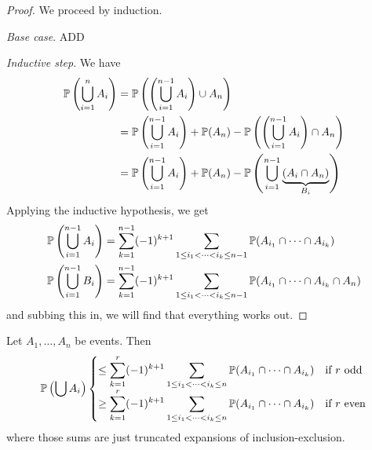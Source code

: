 \documentclass{../../template/note}
\begin{document}
    \begin{proof}
        We proceed by induction.

        \emph{Base case}. ADD

        \emph{Inductive step}. We have
        \begin{align*}
            \mathbb P\left(\bigcup_{i=1}^n A_i\right) &= \mathbb P\left(\left(\bigcup_{i=1}^{n-1} A_i\right) \cup A_n\right) \\
            &= \mathbb P\left(\bigcup_{i=1}^{n-1} A_i\right) + \mathbb P(A_n) - \mathbb P\left(\left(\bigcup_{i=1}^{n-1} A_i\right) \cap A_n\right) \\
            &= \mathbb P\left(\bigcup_{i=1}^{n-1} A_i\right) + \mathbb P(A_n) - \mathbb P\left(\bigcup_{i=1}^{n-1} \underbrace{\left(A_i \cap A_n\right)}_{B_i}\right)
        \end{align*}
        Applying the inductive hypothesis, we get
        \begin{align*}
            \mathbb P\left(\bigcup_{i=1}^{n-1} A_i\right) &= \sum_{k=1}^{n-1} (-1)^{k+1} \sum_{1 \leq i_1 < \dots < i_k \leq n-1} \mathbb P(A_{i_1} \cap \dots \cap A_{i_k}) \\
            \mathbb P\left(\bigcup_{i=1}^{n-1} B_i\right) &= \sum_{k=1}^{n-1} (-1)^{k+1} \sum_{1 \leq i_1 < \dots < i_k \leq n-1} \mathbb P(A_{i_1} \cap \dots \cap A_{i_k} \cap A_n)
        \end{align*}
        and subbing this in, we will find that everything works out.
    \end{proof}
    
    \begin{proposition}
        Let \(A_1, \dots, A_n\) be events. Then
        \begin{align*}
            \mathbb P\left(\bigcup A_i\right) \begin{cases}
                \displaystyle \leq \sum_{k=1}^r (-1)^{k+1} \sum_{1 \leq i_1 < \dots < i_k \leq n} \mathbb P(A_{i_1} \cap \cdots \cap A_{i_k}) & \text{if } r \text{ odd} \\
                \displaystyle \geq \sum_{k=1}^r (-1)^{k+1} \sum_{1 \leq i_1 < \dots < i_k \leq n} \mathbb P(A_{i_1} \cap \cdots \cap A_{i_k}) & \text{if } r \text{ even} 
            \end{cases}
        \end{align*}
        where those sums are just truncated expansions of inclusion-exclusion.
    \end{proposition}
    
\end{document}
